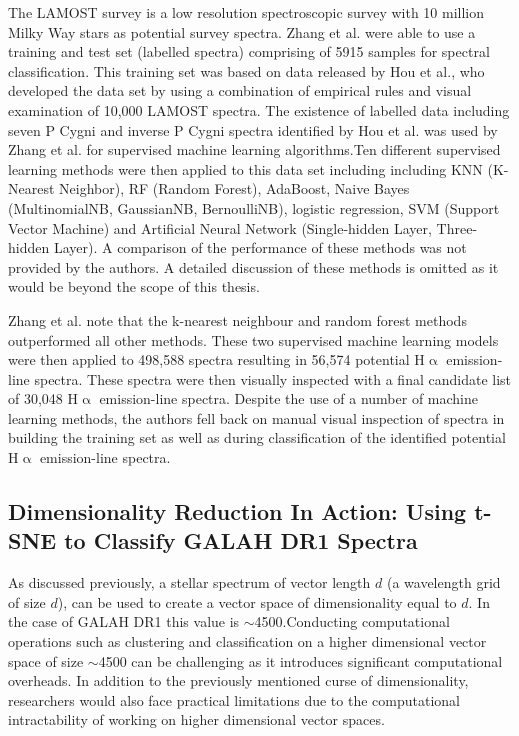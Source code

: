 The LAMOST survey is a low resolution spectroscopic survey with 10 million Milky Way stars as potential survey spectra. Zhang et al. were able to use a training and test set (labelled spectra) comprising of 5915 samples for spectral classification. This training set was based on data released by Hou et al.\cite{hou2016catalog}, who developed the data set by using a combination of empirical rules and visual examination of 10,000 LAMOST spectra. The existence of labelled data including seven P Cygni and inverse P Cygni spectra identified by Hou et al. was used by Zhang et al. for supervised machine learning algorithms.Ten different supervised learning methods were then applied to this data set including including KNN (K-Nearest Neighbor), RF (Random Forest), AdaBoost, Naive Bayes (MultinomialNB, GaussianNB, BernoulliNB), logistic regression, SVM (Support Vector Machine) and Artificial Neural Network (Single-hidden Layer, Three-hidden Layer)\cite{zhang2021catalog}. A comparison of the performance of these methods was not provided by the authors. A detailed discussion of these methods is omitted as it would be beyond the scope of this thesis. 

Zhang et al. note that the k-nearest neighbour and random forest methods outperformed all other methods. These two supervised machine learning models were then applied to 498,588 spectra resulting in 56,574 potential H$\upalpha$ emission-line spectra. These spectra were then visually inspected with a final candidate list of 30,048 H$\upalpha$ emission-line spectra. Despite the use of a number of machine learning methods, the authors fell back on manual visual inspection of spectra in building the training set as well as during classification of the identified potential H$\upalpha$ emission-line spectra.

\subsection{Dimensionality Reduction In Action: Using t-SNE to Classify GALAH DR1 Spectra}

As discussed previously, a stellar spectrum of vector length $d$ (a wavelength grid of size $d$), can be used to create a vector space of dimensionality equal to $d$. In the case of GALAH DR1 this value is $\sim$4500.Conducting computational operations such as clustering and classification on a higher dimensional vector space of size $\sim$4500 can be challenging as it introduces significant computational overheads. In addition to the previously mentioned curse of dimensionality, researchers would also face practical limitations due to the computational intractability of working on higher dimensional vector spaces.

